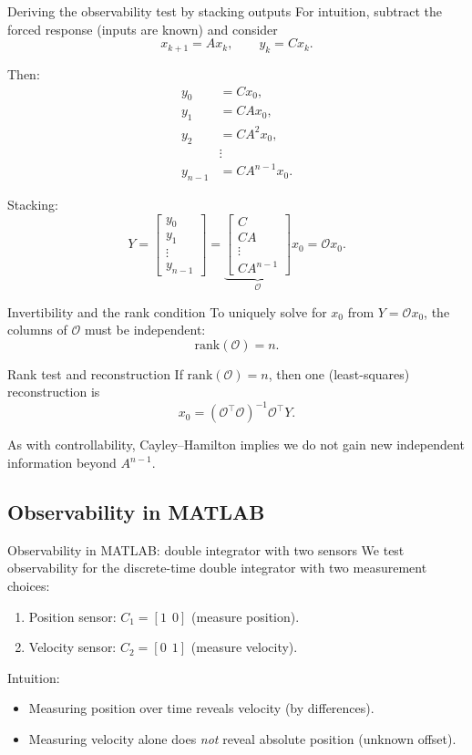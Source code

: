 \documentclass[aspectratio=169,10pt]{beamer}
\newcommand{\Ocal}{\mathcal{O}}
\begin{document}
\begin{frame}{Deriving the observability test by stacking outputs}
For intuition, subtract the forced response (inputs are known) and consider
\[
x_{k+1}=Ax_k,\qquad y_k=Cx_k.
\]

Then:
\begin{align*}
y_0 &= Cx_0,\\
y_1 &= CAx_0,\\
y_2 &= CA^2x_0,\\
&\vdots\\
y_{n-1} &= CA^{n-1}x_0.
\end{align*}

Stacking:
\[
Y=
\begin{bmatrix}
y_0\\y_1\\\vdots\\y_{n-1}
\end{bmatrix}
=
\underbrace{
\begin{bmatrix}
C\\CA\\\vdots\\CA^{n-1}
\end{bmatrix}}_{\Ocal}
x_0
= \Ocal x_0.
\]
\end{frame}

\begin{frame}{Invertibility and the rank condition}
To uniquely solve for \(x_0\) from \(Y=\Ocal x_0\), the columns of \(\Ocal\) must be independent:
\[
\mathrm{rank}(\Ocal)=n.
\]

\begin{summarybox}{Rank test and reconstruction}
If \(\mathrm{rank}(\Ocal)=n\), then one (least-squares) reconstruction is
\[
x_0 = (\Ocal^\top \Ocal)^{-1}\Ocal^\top Y.
\]
\end{summarybox}

As with controllability, Cayley--Hamilton implies we do not gain new independent information beyond \(A^{n-1}\).
\end{frame}

\subsection{Observability in MATLAB}

\begin{frame}{Observability in MATLAB: double integrator with two sensors}
We test observability for the discrete-time double integrator with two measurement choices:
\begin{enumerate}
\item Position sensor: \(C_1=[1\ \ 0]\) (measure position).
\item Velocity sensor: \(C_2=[0\ \ 1]\) (measure velocity).
\end{enumerate}

Intuition:
\begin{itemize}
  \item Measuring position over time reveals velocity (by differences).
  \item Measuring velocity alone does \emph{not} reveal absolute position (unknown offset).
\end{itemize}
\end{frame}
\end{document}
